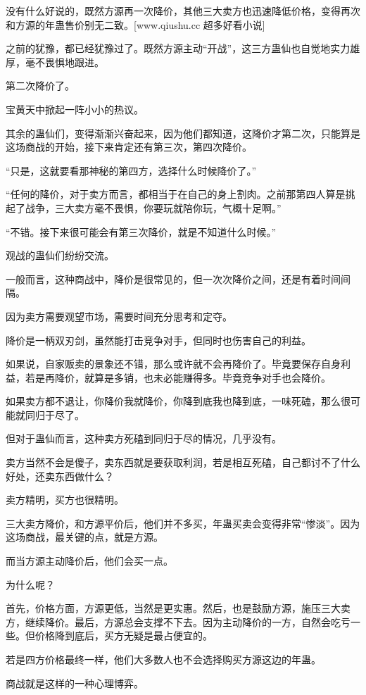 \begin{this_body}
没有什么好说的，既然方源再一次降价，其他三大卖方也迅速降低价格，变得再次和方源的年蛊售价别无二致。[www.qiushu.cc 超多好看小说]

之前的犹豫，都已经犹豫过了。既然方源主动“开战”，这三方蛊仙也自觉地实力雄厚，毫不畏惧地跟进。

第二次降价了。

宝黄天中掀起一阵小小的热议。

其余的蛊仙们，变得渐渐兴奋起来，因为他们都知道，这降价才第二次，只能算是这场商战的开始，接下来肯定还有第三次，第四次降价。

“只是，这就要看那神秘的第四方，选择什么时候降价了。”

“任何的降价，对于卖方而言，都相当于在自己的身上割肉。之前那第四人算是挑起了战争，三大卖方毫不畏惧，你要玩就陪你玩，气概十足啊。”

“不错。接下来很可能会有第三次降价，就是不知道什么时候。”

观战的蛊仙们纷纷交流。

一般而言，这种商战中，降价是很常见的，但一次次降价之间，还是有着时间间隔。

因为卖方需要观望市场，需要时间充分思考和定夺。

降价是一柄双刃剑，虽然能打击竞争对手，但同时也伤害自己的利益。

如果说，自家贩卖的景象还不错，那么或许就不会再降价了。毕竟要保存自身利益，若是再降价，就算是多销，也未必能赚得多。毕竟竞争对手也会降价。

如果卖方都不退让，你降价我就降价，你降到底我也降到底，一味死磕，那么很可能就同归于尽了。

但对于蛊仙而言，这种卖方死磕到同归于尽的情况，几乎没有。

卖方当然不会是傻子，卖东西就是要获取利润，若是相互死磕，自己都讨不了什么好处，还卖东西做什么？

卖方精明，买方也很精明。

三大卖方降价，和方源平价后，他们并不多买，年蛊买卖会变得非常“惨淡”。因为这场商战，最关键的点，就是方源。

而当方源主动降价后，他们会买一点。

为什么呢？

首先，价格方面，方源更低，当然是更实惠。然后，也是鼓励方源，施压三大卖方，继续降价。最后，方源总会支撑不下去。因为主动降价的一方，自然会吃亏一些。但价格降到底后，买方无疑是最占便宜的。

若是四方价格最终一样，他们大多数人也不会选择购买方源这边的年蛊。

商战就是这样的一种心理博弈。


\end{this_body}
